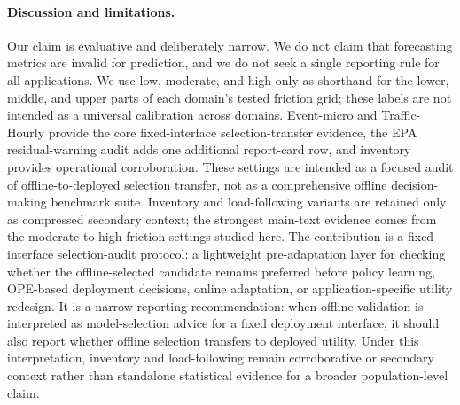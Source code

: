 \documentclass{article}
\begin{document}
\paragraph{Discussion and limitations.} Our claim is evaluative and deliberately narrow. We do not claim that forecasting metrics are invalid for prediction, and we do not seek a single reporting rule for all applications. We use low, moderate, and high only as shorthand for the lower, middle, and upper parts of each domain's tested friction grid; these labels are not intended as a universal calibration across domains. Event-micro and Traffic-Hourly provide the core fixed-interface selection-transfer evidence, the EPA residual-warning audit adds one additional report-card row, and inventory provides operational corroboration. These settings are intended as a focused audit of offline-to-deployed selection transfer, not as a comprehensive offline decision-making benchmark suite. Inventory and load-following variants are retained only as compressed secondary context; the strongest main-text evidence comes from the moderate-to-high friction settings studied here. The contribution is a fixed-interface selection-audit protocol: a lightweight pre-adaptation layer for checking whether the offline-selected candidate remains preferred before policy learning, OPE-based deployment decisions, online adaptation, or application-specific utility redesign. It is a narrow reporting recommendation: when offline validation is interpreted as model-selection advice for a fixed deployment interface, it should also report whether offline selection transfers to deployed utility. Under this interpretation, inventory and load-following remain corroborative or secondary context rather than standalone statistical evidence for a broader population-level claim.
\end{document}
